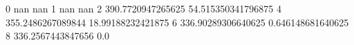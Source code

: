 0 nan nan
1 nan nan
2 390.7720947265625 54.515350341796875
4 355.2486267089844 18.99188232421875
6 336.90289306640625 0.646148681640625
8 336.2567443847656 0.0
